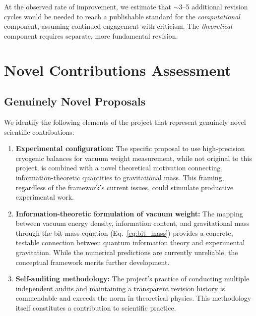 \documentclass[11pt,a4paper]{article}
\begin{document}
At the observed rate of improvement, we estimate that $\sim$3--5 additional revision cycles would be needed to reach a publishable standard for the \textit{computational} component, assuming continued engagement with criticism. The \textit{theoretical} component requires separate, more fundamental revision.

\section{Novel Contributions Assessment}

\subsection{Genuinely Novel Proposals}

We identify the following elements of the project that represent genuinely novel scientific contributions:

\begin{enumerate}[leftmargin=1.5em]
  \item \textbf{Experimental configuration:} The specific proposal to use high-precision cryogenic balances for vacuum weight measurement, while not original to this project, is combined with a novel theoretical motivation connecting information-theoretic quantities to gravitational mass. This framing, regardless of the framework's current issues, could stimulate productive experimental work.
  
  \item \textbf{Information-theoretic formulation of vacuum weight:} The mapping between vacuum energy density, information content, and gravitational mass through the bit-mass equation (Eq.~\ref{eq:bit_mass}) provides a concrete, testable connection between quantum information theory and experimental gravitation. While the numerical predictions are currently unreliable, the conceptual framework merits further development.
  
  \item \textbf{Self-auditing methodology:} The project's practice of conducting multiple independent audits and maintaining a transparent revision history is commendable and exceeds the norm in theoretical physics. This methodology itself constitutes a contribution to scientific practice.
\end{enumerate}
\end{document}
